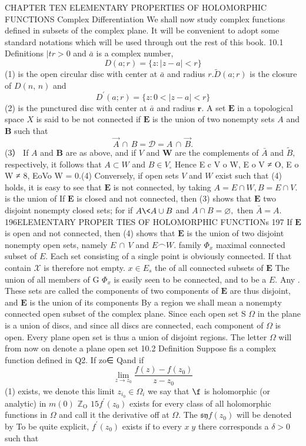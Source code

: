 CHAPTER TEN ELEMENTARY PROPERTIES OF HOLOMORPHIC FUNCTIONS Complex Differentiation We shall now study complex functions defined in subsets of the complex plane. It will be convenient to adopt some standard notations which will be used through out the rest of this book. 10.1 Definitions $|t r>0$ and $\bar{a}$ is a complex number, $$ D(a;r)=\{z\colon|z-a|<r\} $$ (1) is the open circular disc with center at $\bar{a}$ and radius $r.{\tilde{D}}(a;r)$ is the closure of $\scriptstyle D(n,\,n)$ and $$ D^{\prime}(a;r)=\{z:0<|z-a|<r\} $$ (2) is the punctured disc with center at $\bar{a}$ and radius ${\boldsymbol{r}}.$ A set $\boldsymbol{E}$ in a topological space $X$ is said to be not connected if $\boldsymbol{E}$ is the union of two nonempty sets $\scriptstyle A$ and $\boldsymbol{B}$ such that $$ \vec{A}\,\cap\,B=\mathcal{D}=A\,\cap\,\vec{B}. $$ (3） If $\scriptstyle A$ and $\boldsymbol{B}$ are as above, and if ${\mathbf{}}V$ and ${\boldsymbol{W}}$ are the complements of $\bar{A}$ and ${\tilde{B}},$ respectively, it follows that $A\subset W$ and $\scriptstyle B\in V_{\circ}$ Hence E c V o W, E o V ≠ O, E o W ≠ 8, EoVo W = 0.(4) Conversely, if open sets ${\mathbf{}}V$ and $\textstyle W$ exist such that (4) holds, it is easy to see that $\boldsymbol{E}$ is not connected, by taking $A=E\cap W,B=E\cap V.$ is the union of If $\boldsymbol{E}$ is closed and not connected, then (3) shows that $\boldsymbol{E}$ two disjoint nonempty closed sets; for if $A\<A\cup B$ and $A\cap B=\varnothing,$ then $\bar{A}=A.$ 196ELEMENTARY PROPER TIES OF HOLOMORPHIC FUNCTIONs 197 If $\boldsymbol{E}$ is open and not connected, then (4) shows that $\boldsymbol{E}$ is the union of two disjoint nonempty open sets, namely $E\,\cap\,V$ and $E\frown W.$ family $\Phi_{x}$ maximal connected subset of $\textstyle E.$ Each set consisting of a single point is obviously connected. If that contain $\scriptstyle{\mathcal{X}}$ is therefore not empty. $\scriptstyle x\in E_{s}$ the of all connected subsets of ${\boldsymbol{E}}$ The union of all members of G $\Phi_{x}$ is easily seen to be connected, and to be a $\textstyle E.$ Any . These sets are called the components of two components of $\boldsymbol{E}$ are thus disjoint, and $\boldsymbol{E}$ is the union of its components By a region we shall mean a nonempty connected open subset of the complex plane. Since each open set S $\Omega$ in the plane is a union of discs, and since all discs are connected, each component of $\Omega$ is open. Every plane open set is thus a union of disjoint regions. The letter $\Omega$ will from now on denote a plane open set 10.2 Definition Suppose fis a complex function defined in Q2. If zo∈ Qand if $$ \operatorname*{lim}_{z\to z_{0}}{\frac{f(z)-f(z_{0})}{z-z_{0}}} $$ (1) exists, we denote this limit $z_{i_{0}}\in\Omega_{i}$ we say that $\boldsymbol{\f}$ is holomorphic (or analytic) in $\scriptstyle m(0)$ $\mathbb{Z}_{\mathrm{O}}$ $15f^{\prime}(z_{0})$ exists for every class of all holomorphic functions in $\Omega$ and call it the derivative off at $\Omega.$ The $\mathfrak{s y}f(z_{0})$ will be denoted by To be quite explicit, $f^{\prime}(z_{0})$ exists $\mathrm{if}$ to every $\scriptstyle x\;y$ there corresponds a $\scriptstyle\delta>0$ such that $$ 